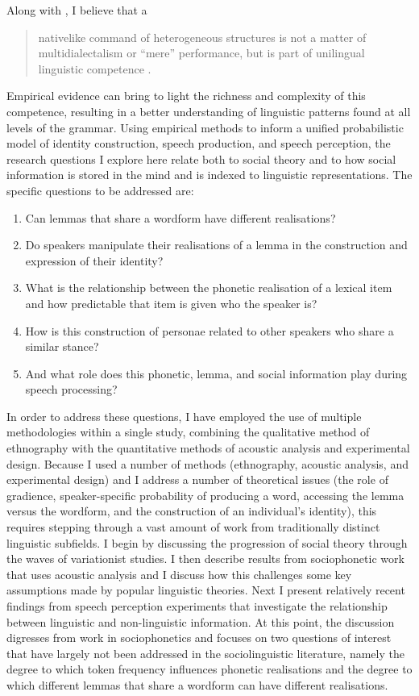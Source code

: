 Along with , I believe that a

\begin{quote}
	nativelike command of heterogeneous structures is not a matter of multidialectalism or ``mere'' performance, but is part of unilingual linguistic competence \cite[101]{weinrichlabovherzog1968}.
\end{quote}

\noindent Empirical evidence can bring to light the richness and complexity of this competence, resulting in a better understanding of linguistic patterns found at all levels of the grammar.  Using empirical methods to inform a unified probabilistic model of identity construction, speech production, and speech perception, the research questions I explore here relate both to social theory and to how social information is stored in the mind and is indexed to linguistic representations.  The specific questions to be addressed are:

\begin{enumerate}
	\item Can lemmas that share a wordform have different realisations? 
	\item Do speakers manipulate their realisations of a lemma in the construction and expression of their identity?  
	\item What is the relationship between the phonetic realisation of a lexical item and how predictable that item is given who the speaker is?
	\item How is this construction of personae related to other speakers who share a similar stance?
	\item And what role does this phonetic, lemma, and social information play during speech processing?   
\end{enumerate}

\noindent In order to address these questions, I have employed the use of multiple methodologies within a single study, combining the qualitative method of ethnography with the quantitative methods of acoustic analysis and experimental design.
Because I used a number of methods (ethnography, acoustic analysis, and experimental design) and I address a number of theoretical issues (the role of gradience, speaker-specific probability of producing a word, accessing the lemma versus the wordform, and the construction of an individual's identity), this requires stepping through a vast amount of work from traditionally distinct linguistic subfields.  I begin by discussing the progression of social theory through the waves of variationist studies.  I then describe results from sociophonetic work that uses acoustic analysis and I discuss how this challenges some key assumptions made by popular linguistic theories.  Next I present relatively recent findings from speech perception experiments that investigate the relationship between linguistic and non-linguistic information.  At this point, the discussion digresses from work in sociophonetics and focuses on two questions of interest that have largely not been addressed in the sociolinguistic literature, namely the degree to which token frequency influences phonetic realisations and the degree to which different lemmas that share a wordform can have different realisations. 

